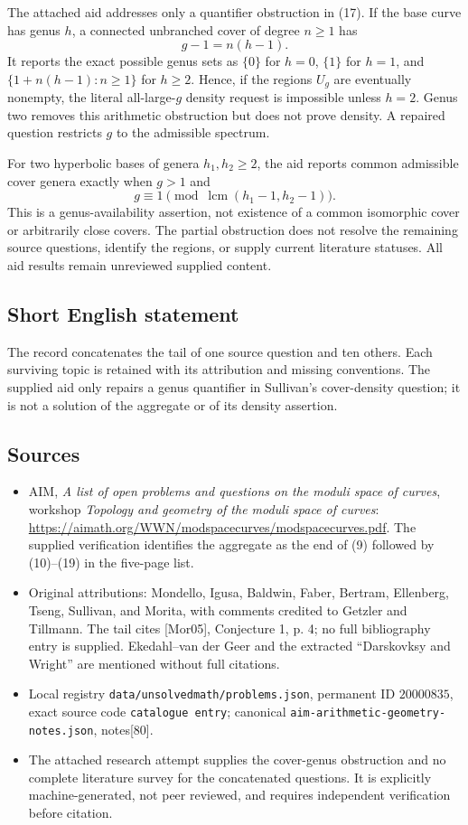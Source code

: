\documentclass[11pt]{article}
\begin{document}
The attached aid addresses only a quantifier obstruction in (17). If the base curve has genus \(h\), a connected unbranched cover of degree \(n\geq1\) has
\[
g-1=n(h-1).
\]
It reports the exact possible genus sets as \(\{0\}\) for \(h=0\), \(\{1\}\) for \(h=1\), and \(\{1+n(h-1):n\geq1\}\) for \(h\geq2\). Hence, if the regions \(U_g\) are eventually nonempty, the literal all-large-\(g\) density request is impossible unless \(h=2\). Genus two removes this arithmetic obstruction but does not prove density. A repaired question restricts \(g\) to the admissible spectrum.

For two hyperbolic bases of genera \(h_1,h_2\geq2\), the aid reports common admissible cover genera exactly when \(g>1\) and
\[
g\equiv1\pmod{\operatorname{lcm}(h_1-1,h_2-1)}.
\]
This is a genus-availability assertion, not existence of a common isomorphic cover or arbitrarily close covers. The partial obstruction does not resolve the remaining source questions, identify the regions, or supply current literature statuses. All aid results remain unreviewed supplied content.
\subsection{Short English statement}
The record concatenates the tail of one source question and ten others. Each surviving topic is retained with its attribution and missing conventions. The supplied aid only repairs a genus quantifier in Sullivan's cover-density question; it is not a solution of the aggregate or of its density assertion.
\subsection{Sources}
\begin{itemize}
\item AIM, \emph{A list of open problems and questions on the moduli space of curves}, workshop \emph{Topology and geometry of the moduli space of curves}: \url{https://aimath.org/WWN/modspacecurves/modspacecurves.pdf}. The supplied verification identifies the aggregate as the end of (9) followed by (10)--(19) in the five-page list.
\item Original attributions: Mondello, Igusa, Baldwin, Faber, Bertram, Ellenberg, Tseng, Sullivan, and Morita, with comments credited to Getzler and Tillmann. The tail cites [Mor05], Conjecture 1, p. 4; no full bibliography entry is supplied. Ekedahl--van der Geer and the extracted ``Darskovksy and Wright'' are mentioned without full citations.
\item Local registry \texttt{data/unsolvedmath/problems.json}, permanent ID \(20000835\), exact source code \texttt{catalogue entry}; canonical \texttt{aim-arithmetic-geometry-notes.json}, notes[80].
\item The attached research attempt supplies the cover-genus obstruction and no complete literature survey for the concatenated questions. It is explicitly machine-generated, not peer reviewed, and requires independent verification before citation.
\end{itemize}
\end{document}
